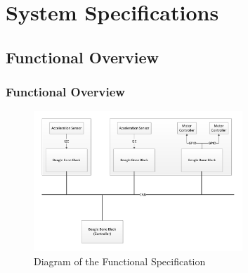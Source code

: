 \documentclass{beamer}
\begin{document}
%


\section{System Specifications}
\subsection{Functional Overview}
\begin{frame}
  \frametitle{Functional Overview}
\begin{figure}
\includegraphics[width=0.7\textwidth]{functional_specification_can.pdf}
\caption{Diagram of the Functional Specification}
\end{figure}
\end{frame}
\end{document}
